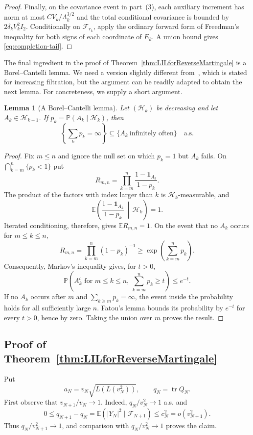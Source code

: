 \documentclass[12pt, reqno, final, a4paper]{amsart}
\theoremstyle{plain}
\newtheorem{lemma}[theorem]{Lemma}
\theoremstyle{definition}
\theoremstyle{remark}
\DeclareMathOperator{\tr}{tr}
\newcommand{\E}{\mathbb E}
\newcommand{\1}{\mathbf 1}
\begin{document}
\begin{proof}
Finally, on the covariance event in part~(3), each auxiliary increment has
norm at most $CV_k/\Lambda_k^{3/2}$ and the total conditional covariance is
bounded by $2\delta_kV_k^2I_2$. Conditionally on $\mathcal F_{r_k}$, apply the ordinary forward form of
Freedman's inequality for both signs of each coordinate of $E_k$. A union
bound gives \eqref{eq:completion-tail}.
\end{proof}

The final ingredient in the proof of Theorem~\ref{thm:LILforReverseMartingale} is a Borel--Cantelli lemma. We need a version slightly different from~\cite{Free73}, which is stated for increasing filtration, but the argument can be readily adapted to obtain the next lemma. For concreteness, we supply a short argument. 
\begin{lemma}[A Borel--Cantelli lemma]
\label{lem:reverse-conditional-BC}
Let $(\mathcal H_k)$ be decreasing and let $A_k\in\mathcal H_{k-1}$. If
$p_k=\mathbb P(A_k\mid\mathcal H_k)$, then
\[
 \left\{\sum_kp_k=\infty\right\}\subseteq\{A_k\ \text{infinitely often}\}
 \quad\text{a.s.}
\]
\end{lemma}
\begin{proof}
Fix $m\le n$ and ignore the null set on which $p_k=1$ but $A_k$ fails. On
$\bigcap_{k=m}^n\{p_k<1\}$ put
\[
 R_{m,n}=\prod_{k=m}^n\frac{1-\mathbf1_{A_k}}{1-p_k}.
\]
The product of the factors with index larger than $k$ is
$\mathcal H_k$-measurable, and
\[
 \E\left(\frac{1-\mathbf1_{A_k}}{1-p_k}\,\middle|\,\mathcal H_k\right)=1.
\]
Iterated conditioning, therefore, gives $\E R_{m,n}=1$. On the event that no
$A_k$ occurs for $m\le k\le n$,
\[
 R_{m,n}=\prod_{k=m}^n(1-p_k)^{-1}
 \ge \exp\left(\sum_{k=m}^np_k\right).
\]
Consequently, Markov's inequality gives, for $t>0$,
\[
 \mathbb P\left(A_k^c\text{ for }m\le k\le n,
                 \ \sum_{k=m}^np_k\ge t\right)\le e^{-t}.
\]
If no $A_k$ occurs after $m$ and $\sum_{k\ge m}p_k=\infty$, the event inside
the probability holds for all sufficiently large $n$. Fatou's lemma bounds its
probability by $e^{-t}$ for every $t>0$, hence by zero. Taking the union over
$m$ proves the result.
\end{proof}

\subsection{Proof of Theorem~\ref{thm:LILforReverseMartingale}}
Put
\[
 a_N=v_N\sqrt{L(L(v_N^2))},
 \qquad q_N=\tr Q_N.
\]
First observe that $v_{N+1}/v_N\to1$. Indeed, $q_N/v_N^2\to1$ a.s. and
\[
 0\le q_{N+1}-q_N
 =\E(|Y_N|^2\mid\mathcal F_{N+1})
 \le c_N^2=o(v_{N+1}^2).
\]
Thus $q_N/v_{N+1}^2\to1$, and comparison with $q_N/v_N^2\to1$ proves the
claim.
\end{document}
